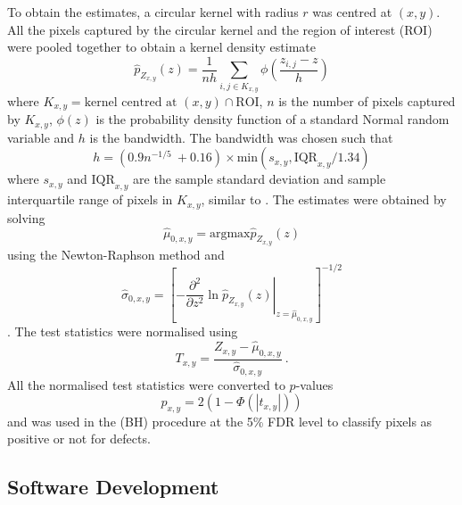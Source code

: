 \documentclass[twocolumn]{article}
\begin{document}
To obtain the estimates, a circular kernel with radius $r$ was centred at $(x,y)$. All the pixels captured by the circular kernel and the region of interest (ROI) were pooled together to obtain a kernel density estimate \citep{parzen1962on, friedman2001elements}
\begin{equation}
\widehat{p}_{Z_{x,y}}(z) = 
\frac{1}{nh}
  \sum_{i,j\in K_{x,y}}\phi\left(
    \dfrac{z_{i,j}-z}{h}
  \right)
\end{equation}
where $K_{x,y} = \text{kernel centred at }(x,y) \cap \text{ROI}$, $n$ is the number of pixels captured by $K_{x,y}$, $\phi(z)$ is the probability density function of a standard Normal random variable and $h$ is the bandwidth. The bandwidth was chosen such that
\begin{equation}
  h = (0.9n^{-1/5}\ + 0.16) \times \text{min}\left(s_{x,y},\text{IQR}_{x,y}/1.34\right)
  \label{eq:inference_ourruleofthumb}
\end{equation}
where $s_{x,y}$ and $\text{IQR}_{x,y}$ are the sample standard deviation and sample interquartile range of pixels in $K_{x,y}$, similar to \cite{silverman1986density, sheather2004density}. The estimates were obtained by solving
\begin{equation}
\widehat\mu_{0,x,y} = \text{argmax} \widehat{p}_{Z_{x,y}}(z)
\end{equation}
using the Newton-Raphson method and
\begin{equation}
  \widehat{\sigma}_{0,x,y} = \left[
    \left.
      -\dfrac{\partial^2}{\partial z^2}\ln\widehat{p}_{Z_{x,y}}(z)
    \right|_{z=\widehat{\mu}_{0,x,y}}
  \right]^{-1/2}
\end{equation}
\citep{efron2004large}. The test statistics were normalised using
\begin{equation}
  T_{x,y} = 
  \dfrac{
    Z_{x,y}-\widehat{\mu}_{0,x,y}
  }
  {
    \widehat{\sigma}_{0,x,y}
  } \ .
\end{equation}
All the normalised test statistics were converted to $p$-values
\begin{equation}
  p_{x,y} = 2(1-\Phi(|t_{x,y}|))
\end{equation}
and was used in the \cite{benjamini1995controlling} (BH) procedure at the 5\% FDR level to classify pixels as positive or not for defects.

\subsection{Software Development}
\end{document}
